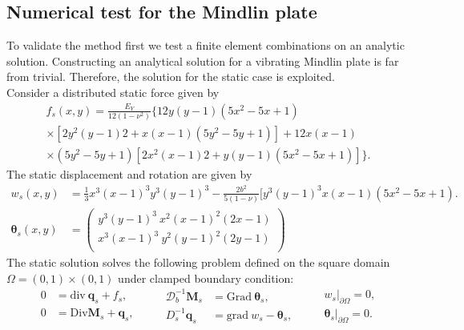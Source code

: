 \subsection{Numerical test for the Mindlin plate}
To validate the method first we test a finite element combinations on an analytic solution. Constructing an analytical solution for a vibrating Mindlin plate is far from trivial. Therefore, the solution for the static case \cite{veiga2013} is exploited. \\

Consider a distributed static force given by 
\begin{equation*}
\begin{aligned}
f_s(x,y)=\frac{E_Y}{12 (1-\nu^2)} \{12 y(y-1)(5x^2-5x+1) \\
\times [2y^2(y-1)2+x(x-1)(5y^2-5y+1)] +12x(x-1)\\
\times (5y^2-5y+1)[2x^2(x-1)2+y(y-1)(5x^2-5x+1)]\}.
\end{aligned}
\end{equation*}
The static displacement and rotation are given by
\begin{align*}
w_s(x,y) &= \frac{1}{3} x^3(x-1)^3 y^3 (y-1)^3 -\frac{2 b^2}{5(1-\nu)}[y^3(y-1)^3 x(x-1)(5 x^2-5x+1). \\
\bm{\theta}_{s}(x,y) &= 
\begin{pmatrix}
y^3(y-1)^3 \ x^2 (x-1)^2 (2x-1) \\
x^3(x-1)^3 \ y^2 (y-1)^2 (2y-1) \\
\end{pmatrix}
\end{align*}
The static solution solves the following problem defined on the square domain $\Omega=(0,1)\times(0,1)$ under clamped boundary condition:
\begin{equation}
\begin{aligned}
0 &= \mathrm{div} \ \bm{q}_s + f_s , \\
0 &= \mathrm{Div} \bm{M}_s + \bm{q}_s, \\
\end{aligned} \qquad
\begin{aligned}
\bm{\mathcal{D}}_b^{-1} \bm{M}_s &= \mathrm{Grad} \ \bm{\theta}_s, \\
D_s^{-1} \bm{q}_s &= \mathrm{grad} \ w_s - \bm{\theta}_s, \\
\end{aligned}
\qquad
\begin{aligned}
w_s\vert_{\partial\Omega} = 0, \\
\bm{\theta}_s\vert_{\partial\Omega} = 0. \\
\end{aligned}
\end{equation}
